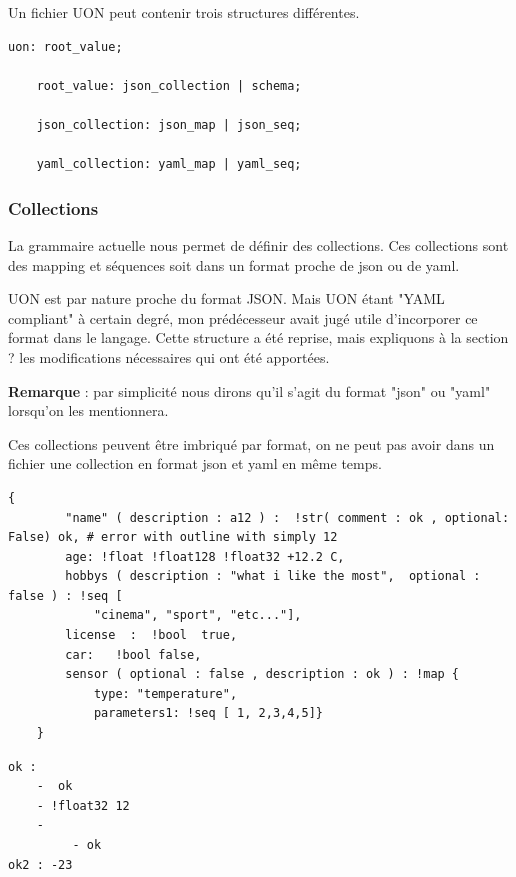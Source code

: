 \documentclass[
    iict, %
    il, %
]{heig-tb}
\begin{document}
Un fichier UON peut contenir trois structures différentes.

\begin{lstlisting}[frame=single,caption={uon-root-value},label={uon-root-value}]
    uon: root_value;

    root_value: json_collection | schema;

    json_collection: json_map | json_seq;

    yaml_collection: yaml_map | yaml_seq;
\end{lstlisting}

\subsubsection{Collections}
La grammaire actuelle nous permet de définir des collections. Ces collections sont des mapping et séquences soit dans un format proche de json ou de yaml.

UON est par nature proche du format JSON. Mais UON étant "YAML compliant" à certain degré, mon prédécesseur avait jugé utile d'incorporer ce format
dans le langage. Cette structure a été reprise, mais expliquons à la section ? %
les modifications nécessaires qui ont été apportées.

\textbf{Remarque} : par simplicité nous dirons qu'il s'agit du format "json" ou "yaml" lorsqu'on les mentionnera.

Ces collections peuvent être imbriqué par format, on ne peut pas avoir dans un fichier une collection en format json et yaml en même temps.


\begin{lstlisting}[frame=single,caption={json-map},label={json-map}]
    {
        "name" ( description : a12 ) :  !str( comment : ok , optional: False) ok, # error with outline with simply 12
        age: !float !float128 !float32 +12.2 C,
        hobbys ( description : "what i like the most",  optional : false ) : !seq [
            "cinema", "sport", "etc..."],
        license  :  !bool  true,
        car:   !bool false,
        sensor ( optional : false , description : ok ) : !map {
            type: "temperature",
            parameters1: !seq [ 1, 2,3,4,5]}
    }
\end{lstlisting}

\begin{lstlisting}[frame=single,caption={yaml-map},label={yaml-map}]
ok :
    -  ok
    - !float32 12
    -
         - ok
ok2 : -23
\end{lstlisting}
\end{document}

